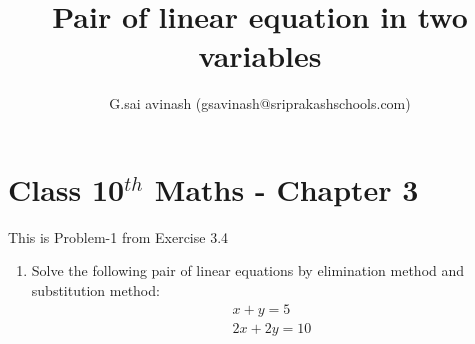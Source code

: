 \documentclass[12pt]{article}
\title{Pair of linear equation in two variables}
\author{G.sai avinash (gsavinash@sriprakashschools.com)}
\begin{document}
\maketitle
\section*{Class 10$^{th}$ Maths - Chapter 3}
This is Problem-1 from Exercise 3.4
\begin{enumerate}
\item   Solve the following pair of linear equations by elimination method and substitution method:                         
\begin{align}
    x+y=5\\
        2x+2y=10 
\end{align}




\end{enumerate}
\end{document}
